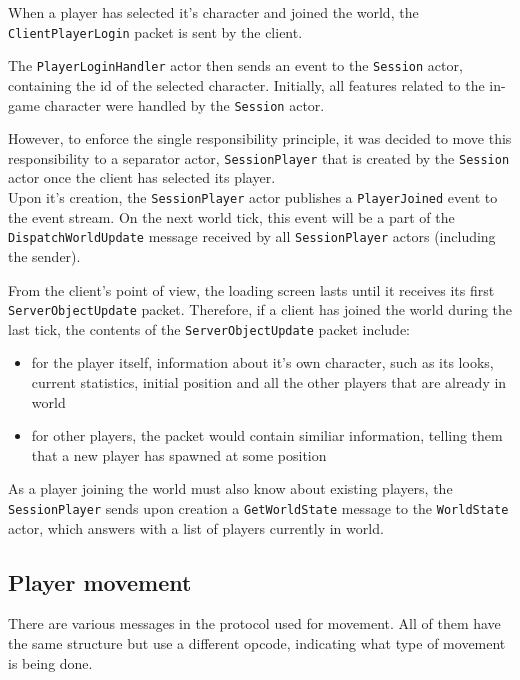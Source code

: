 \documentclass[paper=a4, fontsize=11pt]{scrartcl}
\begin{document}
When a player has selected it's character and joined the world, the
\texttt{ClientPlayerLogin} packet is sent by the client.

The \texttt{PlayerLoginHandler} actor then sends an event to the \texttt{Session}
actor, containing the id of the selected character.
Initially, all features related to the in-game character were handled by the
\texttt{Session} actor.

However, to enforce the single responsibility principle, it was decided to move
this responsibility to a separator actor, \texttt{SessionPlayer} that is created
by the \texttt{Session} actor once the client has selected its player.\\

Upon it's creation, the \texttt{SessionPlayer} actor publishes a
\texttt{PlayerJoined} event to the event stream.  
On the next world tick, this event will be a part of the
\texttt{DispatchWorldUpdate} message received by all \texttt{SessionPlayer}
actors (including the sender).

From the client's point of view, the loading screen lasts until it receives its
first \texttt{ServerObjectUpdate} packet.
Therefore, if a client has joined the world during the last tick, the contents
of the \texttt{ServerObjectUpdate} packet include:
\begin{itemize}
    \item for the player itself, information about it's
        own character, such as its looks, current statistics, initial
        position and all the other players that are already in world
    \item for other players, the packet would contain similiar information,
        telling them that a new player has spawned at some position
\end{itemize}

As a player joining the world must also know about existing players, the
\texttt{SessionPlayer} sends upon creation a \texttt{GetWorldState} message to
the \texttt{WorldState} actor, which answers with a list of players currently in
world.

\subsection{Player movement}

There are various messages in the protocol used for movement.
All of them have the same structure but use a different opcode, indicating what
type of movement is being done.
\end{document}
